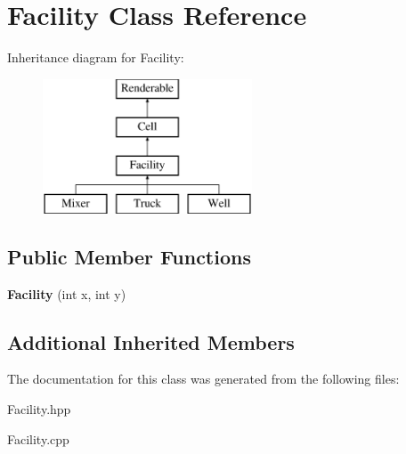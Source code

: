 \hypertarget{class_facility}{}\section{Facility Class Reference}
\label{class_facility}
Inheritance diagram for Facility\+:\begin{figure}[H]
\begin{center}
\leavevmode
\includegraphics[height=4.000000cm]{class_facility}
\end{center}
\end{figure}
\subsection*{Public Member Functions}
\begin{DoxyCompactItemize}
\item 
\mbox{\label{class_facility_aca76f1d74522884d7c9cfc742db5b9e3}} 
{\bfseries Facility} (int x, int y)
\end{DoxyCompactItemize}
\subsection*{Additional Inherited Members}


The documentation for this class was generated from the following files\+:\begin{DoxyCompactItemize}
\item 
Facility.\+hpp\item 
Facility.\+cpp\end{DoxyCompactItemize}
